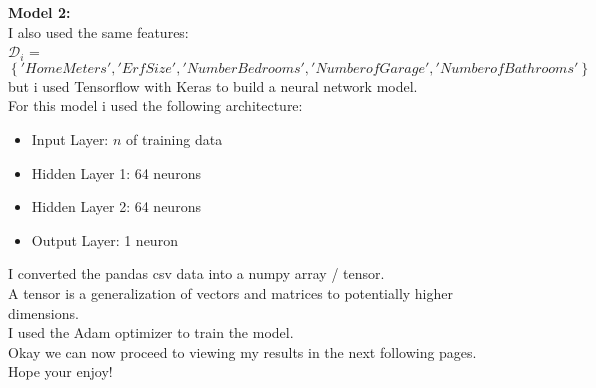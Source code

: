\textbf{Model 2:} \\
I also used the same features: \\
$\mathcal{D}_i$ = $\left\{'Home Meters','Erf Size','Number Bedrooms','Number of Garage','Number of Bathrooms'\right\} $ \\
but i used Tensorflow with Keras to build a neural network model. \\

For this model i used the following architecture: \\
\begin{itemize}
\item Input Layer: $n$ of training data
\item Hidden Layer 1: 64 neurons
\item Hidden Layer 2: 64 neurons
\item Output Layer: 1 neuron
\end{itemize}

I converted the pandas csv data into a numpy array / tensor. \\ 

A tensor is a generalization of vectors and matrices to potentially higher dimensions. \\
I used the Adam optimizer to train the model. \\

Okay we can now proceed to viewing my results in the next following pages. Hope your enjoy! \\